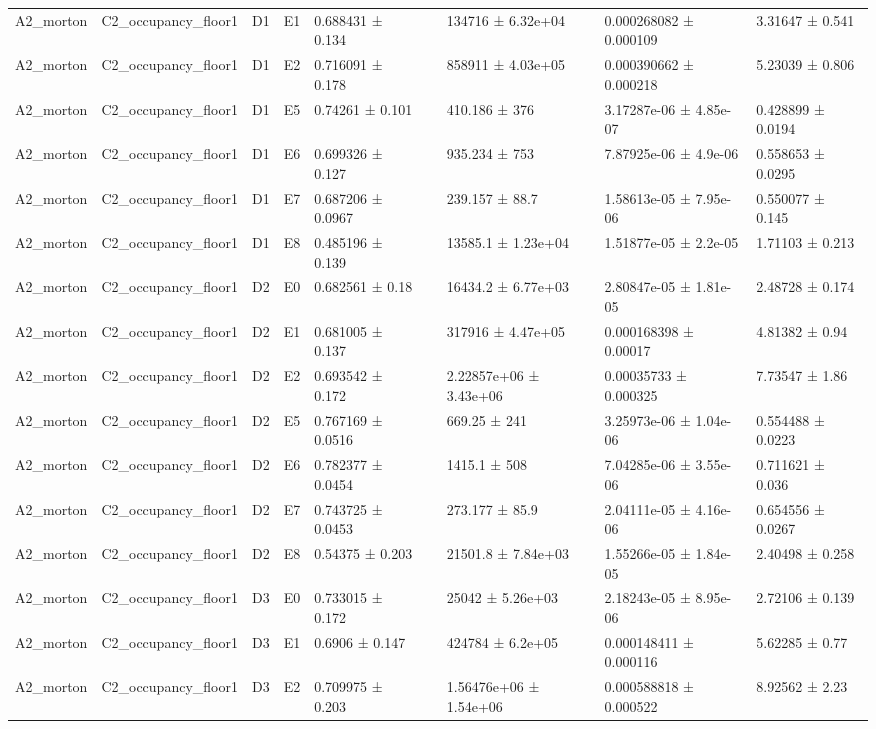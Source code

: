 \begin{table}
\begin{tabular}{lllllllll}
A2\_morton & C2\_occupancy\_floor1 & D1 & E1 & 0.688431 ± 0.134 &  & 134716 ± 6.32e+04 & 0.000268082 ± 0.000109 & 3.31647 ± 0.541 \\
A2\_morton & C2\_occupancy\_floor1 & D1 & E2 & 0.716091 ± 0.178 &  & 858911 ± 4.03e+05 & 0.000390662 ± 0.000218 & 5.23039 ± 0.806 \\
A2\_morton & C2\_occupancy\_floor1 & D1 & E5 & 0.74261 ± 0.101 &  & 410.186 ± 376 & 3.17287e-06 ± 4.85e-07 & 0.428899 ± 0.0194 \\
A2\_morton & C2\_occupancy\_floor1 & D1 & E6 & 0.699326 ± 0.127 &  & 935.234 ± 753 & 7.87925e-06 ± 4.9e-06 & 0.558653 ± 0.0295 \\
A2\_morton & C2\_occupancy\_floor1 & D1 & E7 & 0.687206 ± 0.0967 &  & 239.157 ± 88.7 & 1.58613e-05 ± 7.95e-06 & 0.550077 ± 0.145 \\
A2\_morton & C2\_occupancy\_floor1 & D1 & E8 & 0.485196 ± 0.139 &  & 13585.1 ± 1.23e+04 & 1.51877e-05 ± 2.2e-05 & 1.71103 ± 0.213 \\
A2\_morton & C2\_occupancy\_floor1 & D2 & E0 & 0.682561 ± 0.18 &  & 16434.2 ± 6.77e+03 & 2.80847e-05 ± 1.81e-05 & 2.48728 ± 0.174 \\
A2\_morton & C2\_occupancy\_floor1 & D2 & E1 & 0.681005 ± 0.137 &  & 317916 ± 4.47e+05 & 0.000168398 ± 0.00017 & 4.81382 ± 0.94 \\
A2\_morton & C2\_occupancy\_floor1 & D2 & E2 & 0.693542 ± 0.172 &  & 2.22857e+06 ± 3.43e+06 & 0.00035733 ± 0.000325 & 7.73547 ± 1.86 \\
A2\_morton & C2\_occupancy\_floor1 & D2 & E5 & 0.767169 ± 0.0516 &  & 669.25 ± 241 & 3.25973e-06 ± 1.04e-06 & 0.554488 ± 0.0223 \\
A2\_morton & C2\_occupancy\_floor1 & D2 & E6 & 0.782377 ± 0.0454 &  & 1415.1 ± 508 & 7.04285e-06 ± 3.55e-06 & 0.711621 ± 0.036 \\
A2\_morton & C2\_occupancy\_floor1 & D2 & E7 & 0.743725 ± 0.0453 &  & 273.177 ± 85.9 & 2.04111e-05 ± 4.16e-06 & 0.654556 ± 0.0267 \\
A2\_morton & C2\_occupancy\_floor1 & D2 & E8 & 0.54375 ± 0.203 &  & 21501.8 ± 7.84e+03 & 1.55266e-05 ± 1.84e-05 & 2.40498 ± 0.258 \\
A2\_morton & C2\_occupancy\_floor1 & D3 & E0 & 0.733015 ± 0.172 &  & 25042 ± 5.26e+03 & 2.18243e-05 ± 8.95e-06 & 2.72106 ± 0.139 \\
A2\_morton & C2\_occupancy\_floor1 & D3 & E1 & 0.6906 ± 0.147 &  & 424784 ± 6.2e+05 & 0.000148411 ± 0.000116 & 5.62285 ± 0.77 \\
A2\_morton & C2\_occupancy\_floor1 & D3 & E2 & 0.709975 ± 0.203 &  & 1.56476e+06 ± 1.54e+06 & 0.000588818 ± 0.000522 & 8.92562 ± 2.23 \\

\end{tabular}
\end{table}
